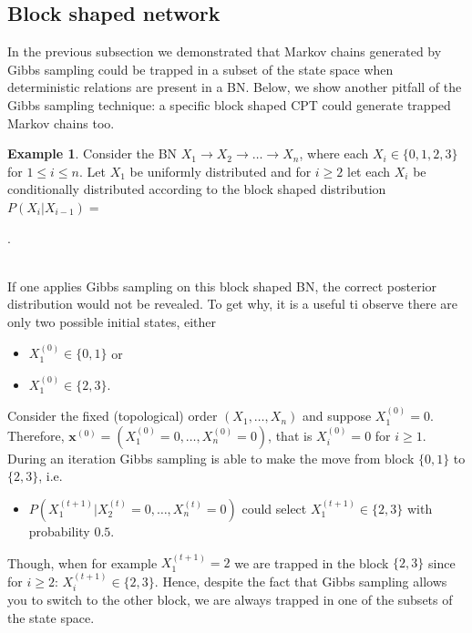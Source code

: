 \documentclass[a4paper, twoside, 11pt]{report}
\newcommand{\bfx}{{\mathbf{x}}}
\theoremstyle{plain}
\theoremstyle{definition}
\newtheorem{example}[thm]{Example}
\theoremstyle{remark}
\begin{document}
\subsection{Block shaped network}
In the previous subsection we demonstrated that Markov chains generated by Gibbs sampling could be trapped in a subset of the state space when deterministic relations are present in a BN. Below, we show another pitfall of the Gibbs sampling technique: a specific block shaped CPT could generate trapped Markov chains too.\\

\begin{example}
Consider the BN $X_1 \to X_2 \to \ldots \to X_n$, where each $X_i \in \{0,1,2,3\}$ for $1 \leq i \leq n$. Let $X_1$ be uniformly distributed and for $i \geq 2$ let each $X_i$ be conditionally distributed according to the block shaped distribution $P(X_i |X_{i-1})=$
\begin{table}[h!]
\centering
{}.
\caption{a block shaped CPT}
\label{block}
\end{table}\\
If one applies Gibbs sampling on this block shaped BN, the correct posterior distribution would not be revealed. To get why, it is a useful ti observe there are only two possible initial states, either
\begin{itemize}
\item $X^{(0)}_1 \in \{0, 1\}$ or
\item $X^{(0)}_1 \in \{2, 3\}$.
\end{itemize}
Consider the fixed (topological) order $(X_1, \ldots, X_n)$ and suppose $X^{(0)}_1 = 0$. Therefore, $\bfx^{(0)} = (X^{(0)}_1 = 0, \ldots, X^{(0)}_n = 0)$, that is $X_i^{(0)} = 0$ for $i \geq 1$. During an iteration Gibbs sampling is able to make the move from block $\{0, 1\}$ to $\{2,3\}$, i.e.
\begin{itemize}
\item $P(X^{(t+1)}_1 | X^{(t)}_2 = 0, \ldots, X^{(t)}_n = 0)$ could select $X^{(t+1)}_1 \in \{2,3\}$ with probability $0.5$.
\end{itemize}
Though, when for example $X^{(t+1)}_1 = 2$ we are trapped in the block $\{2,3\}$ since for $i \geq 2$: $X^{(t+1)}_i \in \{2, 3\}$. Hence, despite the fact that Gibbs sampling allows you to switch to the other block, we are always trapped in one of the subsets of the state space.
\end{example}
\end{document}
